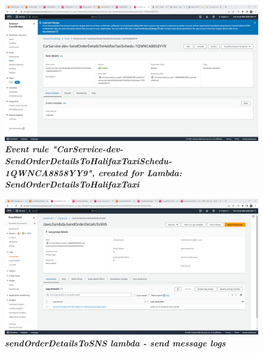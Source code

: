     \begin{figure}[htp]
        \centering
        \includegraphics[scale=1, width=15cm]{PROBLEM 3/Screenshots/3.4 Event rule created for SendOrderDetailsToHalifaxTaxiSchedu lambda.png}
        \caption{\textbf{\textit{Event rule "CarService-dev-SendOrderDetailsToHalifaxTaxiSchedu-1QWNCA8858YY9", created for Lambda: SendOrderDetailsToHalifaxTaxi }}}
        \label{fig:}
    \end{figure}

    \begin{figure}[htp]
        \centering
        \includegraphics[scale=1, width=15cm]{PROBLEM 3/Screenshots/4.1 sendOrderDetailsToSNS lambda - send message - logs.png}
        \caption{\textbf{\textit{sendOrderDetailsToSNS lambda - send message logs}}}
        \label{fig:}
    \end{figure}

